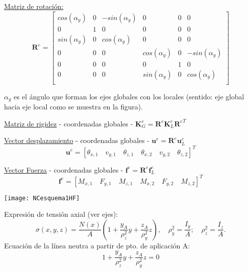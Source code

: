 \underline{Matriz de rotación:}
\renewcommand{\arraystretch}{1.1}
\[
\textbf{R}^e = 
\left[
\begin{matrix}
cos(\alpha_y) & 0 & -sin(\alpha_y) & 0 & 0 & 0 \\
0 & 1 & 0 & 0 & 0 & 0 \\
sin(\alpha_y)  & 0 & cos(\alpha_y)  & 0 & 0 & 0 \\
0 & 0 & 0 & cos(\alpha_y)  & 0 & -sin(\alpha_y) \\
0 & 0 & 0 & 0 & 1 & 0 \\
0 & 0 & 0 & sin(\alpha_y) & 0 & cos(\alpha_y) \\
\end{matrix}
\right]
\]


$\alpha_y$ es el ángulo que forman los ejes globales con los locales (sentido: eje global hacia eje local como se muestra en la figura).

\vspace{0.3cm}
\underline{Matriz de rigidez} - coordenadas globales - $\textbf{K}_G^e=\textbf{R}^e\textbf{K}_L^e{\textbf{R}^e}^T$

\vspace{0.3cm}
\underline{Vector desplazamiento} - coordenadas globales - $\textbf{u}^e=\textbf{R}^e\textbf{u}^e_L$
$$
\textbf{u}^e=[\theta_{x,1} \quad v_{y,1} \quad \theta_{z,1} \quad \theta_{x,2} \quad v_{y,2} \quad \theta_{z,2}]^T
$$

\vspace{0.3cm}
\underline{Vector Fuerza} - coordenadas globales - $\textbf{f}^e=\textbf{R}^e\textbf{f}^e_L$
$$
\textbf{f}^e=[M_{x,1} \quad F_{y,1}\quad M_{z,1}\quad M_{x,2} \quad F_{y,2} \quad M_{z,2}]^T
$$

\begin{center}
\end{center}

\begin{minipage}{0.28\textwidth}
	\texttt{[image: NCesquema1HF]}
\end{minipage}
\begin{minipage}{0.7\textwidth}
Expresión de tensión axial (ver ejes):
	$$
	\sigma(x,y,z)=\frac{N(x)}{A} \left (1+\frac{y_A}{\rho_z^2}y +\frac{z_A}{\rho_y^2}z\right),
\quad
	\rho_y^2=\frac{I_y}{A} ;
	\quad
	\rho_z^2=\frac{I_z}{A}.
	$$
Ecuación de la línea neutra a partir de pto. de aplicación A:
$$
1 +\frac{y_A}{\rho_z^2}y +\frac{z_A}{\rho_y^2}z=0
$$
\end{minipage}

